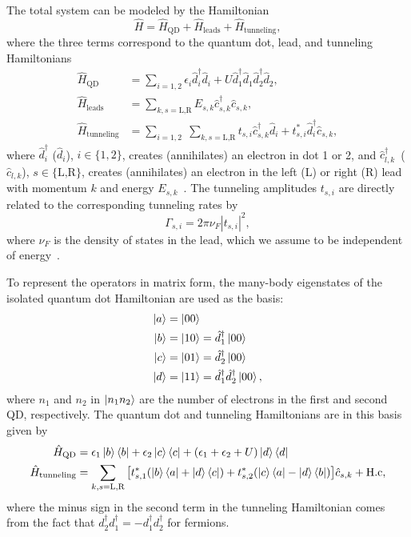 \documentclass[../main.tex]{subfiles}
\begin{document}
The total system can be modeled by the Hamiltonian
\begin{equation}
    \hat H = \hat H_\text{QD} + \hat H_\text{leads} + \hat H_\text{tunneling},
\end{equation}
where the three terms correspond to the quantum dot, lead, and tunneling Hamiltonians
\begin{equation}
    \begin{split}
        \hat H_\text{QD} &= \sum_{i=1,2} \epsilon_i \hat d_i^\dag \hat d_i  + U\hat d_1^\dag \hat d_1 \hat d_2^\dag \hat d_2, \\
        \hat H_\text{leads} &= \sum_{k,s=\text{L,R}} E_{s, k} \hat c_{s,k}^\dag \hat c_{s,k}, \\
        \hat H_\text{tunneling} &= \sum_{i=1,2} \; \sum_{k,s=\text{L,R}} t_{s,i} \hat c_{s,k}^\dag \hat d_i + t_{s,i}^* \hat d_i^\dag \hat c_{s,k},
    \end{split}
\end{equation}
where $\hat d_i^\dag$ ($\hat d_i$), $i\in\{1,2\}$, creates (annihilates) an electron in dot 1 or 2, and $\hat c_{l,k}^\dag$~($\hat c_{l,k}$), $s\in\{\text{L,R}\}$, creates (annihilates) an electron in the left (L) or right (R) lead with momentum $k$ and energy $E_{s,k}$~\cite{doubledot}. The tunneling amplitudes $t_{s,i}$ are directly related to the corresponding tunneling rates by 
\begin{equation}
    \Gamma_{s,i} = 2\pi\nu_F|t_{s,i}|^2,
\end{equation}
where $\nu_F$ is the density of states in the lead, which we assume to be independent of energy~\cite{perlind}.

To represent the operators in matrix form, the many-body eigenstates of the isolated quantum dot Hamiltonian are used as the basis:
\begin{equation}\label{eq:basis}
    \begin{aligned}
        \ket{a} &= \ket{00} \\
        \ket{b} &= \ket{10} = \hat d_1^\dag\ket{00}\\
        \ket{c} &= \ket{01} = \hat d_2^\dag\ket{00}\\
        \ket{d} &= \ket{11} = \hat d_1^\dag\hat d_2^\dag\ket{00},\\
    \end{aligned}
\end{equation}
where $n_1$ and $n_2$ in $\ket{n_1n_2}$ are the number of electrons in the first and second QD, respectively. The quantum dot and tunneling Hamiltonians are in this basis given by
\begin{equation}
    \begin{aligned}
        \hat H_\text{QD} &= \epsilon_1\ket{b}\bra{b} + \epsilon_2\ket{c}\bra{c} + (\epsilon_1 + \epsilon_2 + U)\ket{d}\bra{d} \\
        \hat H_\text{tunneling} &= \sum_{k,s=\text{L,R}} \big[t_{s,1}^*(\ket{b}\bra{a} + \ket{d}\bra{c}) + t_{s,2}^*(\ket{c}\bra{a} - \ket{d}\bra{b})\big]\hat c_{s,k} + \text{H.c},
    \end{aligned}
\end{equation}
where the minus sign in the second term in the tunneling Hamiltonian comes from the fact that $d_2^\dag d_1^\dag = - d_1^\dag d_2^\dag$ for fermions.
\end{document}
